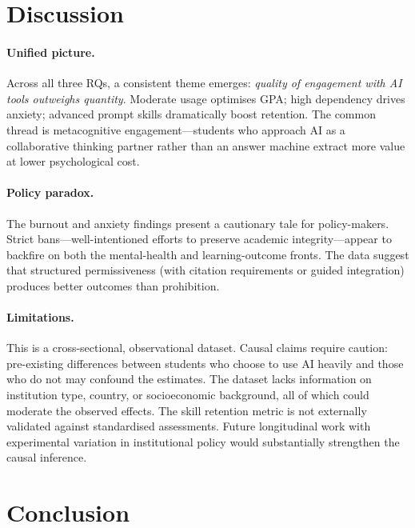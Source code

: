 \documentclass[11pt]{article}
\begin{document}
\section{Discussion}
\label{sec:discussion}

\paragraph{Unified picture.}
Across all three RQs, a consistent theme emerges: \emph{quality of engagement
with AI tools outweighs quantity}. Moderate usage optimises GPA; high dependency
drives anxiety; advanced prompt skills dramatically boost retention. The common
thread is metacognitive engagement---students who approach AI as a collaborative
thinking partner rather than an answer machine extract more value at lower
psychological cost.

\paragraph{Policy paradox.}
The burnout and anxiety findings present a cautionary tale for policy-makers.
Strict bans---well-intentioned efforts to preserve academic integrity---appear to
backfire on both the mental-health and learning-outcome fronts. The data suggest
that structured permissiveness (with citation requirements or guided integration)
produces better outcomes than prohibition.

\paragraph{Limitations.}
This is a cross-sectional, observational dataset. Causal claims require caution:
pre-existing differences between students who choose to use AI heavily and those
who do not may confound the estimates. The dataset lacks information on
institution type, country, or socioeconomic background, all of which could
moderate the observed effects. The skill retention metric is not externally
validated against standardised assessments. Future longitudinal work with
experimental variation in institutional policy would substantially strengthen the
causal inference.

\section{Conclusion}
\label{sec:conclusion}
\end{document}

